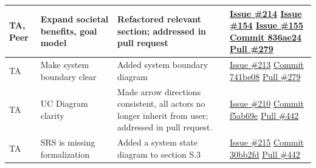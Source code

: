 \documentclass[12pt, titlepage]{article}
\begin{document}
\begin{longtable}{|p{2cm}|p{4cm}|p{5cm}|p{4cm}|}
TA, Peer & Expand societal benefits, goal model & Refactored relevant section; addressed in pull request & \href{https://github.com/OmarHassanAdelhamid/Five-of-a-Kind-capstone-project-/issues/214}{Issue \#214}
\newline\href{https://github.com/OmarHassanAdelhamid/Five-of-a-Kind-capstone-project-/issues/154}{Issue \#154}
\newline\href{https://github.com/OmarHassanAdelhamid/Five-of-a-Kind-capstone-project-/issues/155}{Issue \#155}
\newline\href{https://github.com/OmarHassanAdelhamid/Five-of-a-Kind-capstone-project-/pull/279/commits/836ae244e2b586d0e8fe8a698d4b32b65836123d}{Commit 836ae24}
\newline\href{https://github.com/OmarHassanAdelhamid/Five-of-a-Kind-capstone-project-/pull/279}{Pull \#279} \\ \hline
TA & Make system boundary clear & Added system boundary diagram & \href{https://github.com/OmarHassanAdelhamid/Five-of-a-Kind-capstone-project-/issues/213}{Issue \#213}
\newline\href{https://github.com/OmarHassanAdelhamid/Five-of-a-Kind-capstone-project-/pull/279/commits/741be088bb8af47f066f40b65198f5236b733b3a}{Commit 741be08}
\newline\href{https://github.com/OmarHassanAdelhamid/Five-of-a-Kind-capstone-project-/pull/279}{Pull \#279} \\ \hline
TA & UC Diagram clarity & Made arrow directions consistent, all actors no longer inherit from user; addressed in pull request. & \href{https://github.com/OmarHassanAdelhamid/Five-of-a-Kind-capstone-project-/issues/210}{Issue \#210}
\newline\href{https://github.com/OmarHassanAdelhamid/Five-of-a-Kind-capstone-project-/pull/442/commits/f5ab69ed317064499814f008bf446b8cde2b4949}{Commit f5ab69e}
\newline\href{https://github.com/OmarHassanAdelhamid/Five-of-a-Kind-capstone-project-/pull/442}{Pull \#442} \\ \hline
TA & SRS is missing formalization & Added a system state diagram to section S.3 & \href{https://github.com/OmarHassanAdelhamid/Five-of-a-Kind-capstone-project-/issues/215}{Issue \#215}
\newline\href{https://github.com/OmarHassanAdelhamid/Five-of-a-Kind-capstone-project-/pull/442/commits/30bb2fd418ad76cea34a67a6aaf95fdd11296b60}{Commit 30bb2fd}
\newline\href{https://github.com/OmarHassanAdelhamid/Five-of-a-Kind-capstone-project-/pull/442}{Pull \#442} \\ \hline

\end{longtable}
\end{document}
